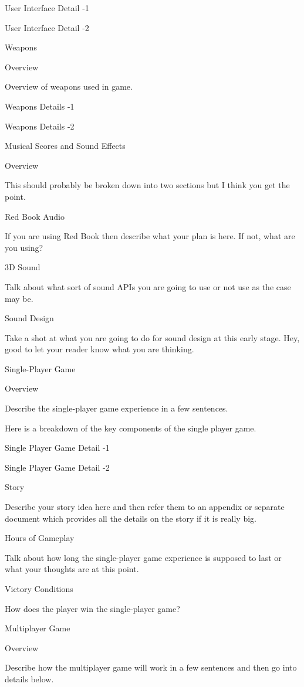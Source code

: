 \documentclass[a4paper]{article}
\begin{document}
User Interface Detail -1

User Interface Detail -2

Weapons

Overview

	Overview of weapons used in game.

Weapons Details -1

Weapons Details -2


Musical Scores and Sound Effects

Overview

	This should probably be broken down into two sections but I think you get the point.	

Red Book Audio

	If you are using Red Book then describe what your plan is here.  If not, what are you using?	

3D Sound

	Talk about what sort of sound APIs you are going to use or not use as the case may be.	

Sound Design

	Take a shot at what you are going to do for sound design at this early stage.  Hey, good to let your reader know what you are thinking.

Single-Player Game

Overview

	Describe the single-player game experience in a few sentences.

	Here is a breakdown of the key components of the single player game.

Single Player Game Detail -1

Single Player Game Detail -2

Story

	Describe your story idea here and then refer them to an appendix or separate document which provides all the details on the story if it is really big.

Hours of Gameplay

	Talk about how long the single-player game experience is supposed to last or what your thoughts are at this point.

Victory Conditions

	How does the player win the single-player game?

Multiplayer Game

Overview

	Describe how the multiplayer game will work in a few sentences and then go into details below.
\end{document}
